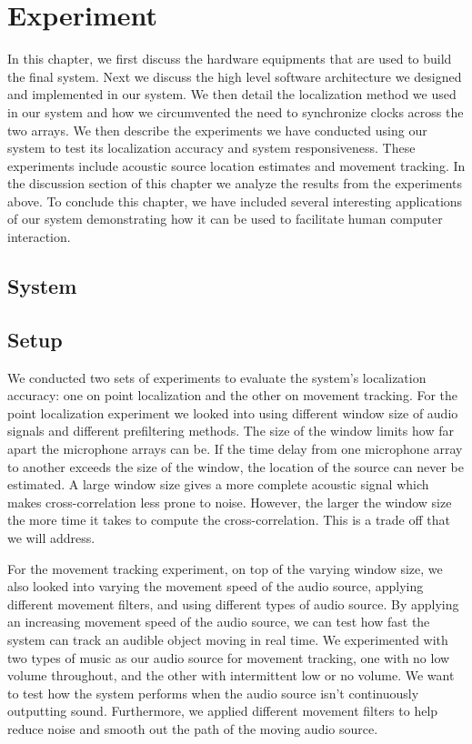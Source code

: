 \chapter{Experiment}
In this chapter, we first discuss the hardware equipments that are used to build the final system. Next we discuss the high level software architecture we designed and implemented in our system. We then detail the localization method we used in our system and how we circumvented the need to synchronize clocks across the two arrays. We then describe the experiments we have conducted using our system to test its localization accuracy and system responsiveness. These experiments include acoustic source location estimates and movement tracking. In the discussion section of this chapter we analyze the results from the experiments above. To conclude this chapter, we have included several interesting applications of our system demonstrating how it can be used to facilitate human computer interaction. 


\section{System}

\clearpage

\section{Setup}

We conducted two sets of experiments to evaluate the system's localization accuracy: one on point localization and the other on movement tracking. For the point localization experiment we looked into using different window size of audio signals and different prefiltering methods. The size of the window limits how far apart the microphone arrays can be. If the time delay from one microphone array to another exceeds the size of the window, the location of the source can never be estimated. A large window size gives a more complete acoustic signal which makes cross-correlation less prone to noise. However, the larger the window size the more time it takes to compute the cross-correlation. This is a trade off that we will address.  

For the movement tracking experiment, on top of the varying window size, we also looked into varying the movement speed of the audio source, applying different movement filters, and using different types of audio source. By applying an increasing movement speed of the audio source, we can test how fast the system can track an audible object moving in real time. We experimented with two types of music as our audio source for movement tracking, one with no low volume throughout, and the other with intermittent low or no volume. We want to test how the system performs when the audio source isn't continuously outputting sound. Furthermore, we applied different movement filters to help reduce noise and smooth out the path of the moving audio source.  

